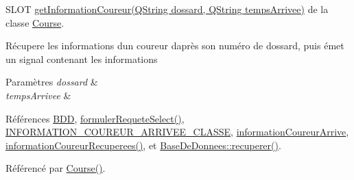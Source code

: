 S\+L\+OT \hyperlink{class_course_a7ba5d2c9865065e95f49a24fbeec7857}{get\+Information\+Coureur(\+Q\+String dossard, Q\+String temps\+Arrivee)} de la classe \hyperlink{class_course}{Course}. 

Récupere les informations d\textquotesingle{}un coureur d\textquotesingle{}après son numéro de dossard, puis émet un signal contenant les informations 
\begin{DoxyParams}{Paramètres}
{\em dossard} & \\
\hline
{\em temps\+Arrivee} & \\
\hline
\end{DoxyParams}


Références \hyperlink{class_course_a28a58b06494361b7a7eb81844d571dd4}{B\+DD}, \hyperlink{class_course_a2ce9c62ead2c878a30af9d9c11b81644}{formuler\+Requete\+Select()}, \hyperlink{course_8h_a2d7a26b028c89e758ebca4fe8455b861}{I\+N\+F\+O\+R\+M\+A\+T\+I\+O\+N\+\_\+\+C\+O\+U\+R\+E\+U\+R\+\_\+\+A\+R\+R\+I\+V\+E\+E\+\_\+\+C\+L\+A\+S\+SE}, \hyperlink{class_course_a14838cc0c491a76baf7e5f12d8d08ab4}{information\+Coureur\+Arrive}, \hyperlink{class_course_a9073b7cb57b9b8a2aee33582bb61eb20}{information\+Coureur\+Recuperees()}, et \hyperlink{class_base_de_donnees_a77539baad389f5acf754cd2cd452403e}{Base\+De\+Donnees\+::recuperer()}.



Référencé par \hyperlink{class_course_af6317ecab95f8a2eb205b4f91b530992}{Course()}.


